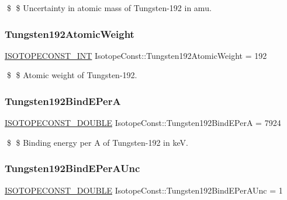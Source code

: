 \$ \$ Uncertainty in atomic mass of Tungsten-\/192 in amu. \mbox{\label{group___isotope_const-_tungsten-_w192_gaad163033f4c7882dc3f116c7ee0eed69}} 
\subsubsection{\texorpdfstring{Tungsten192\+Atomic\+Weight}{Tungsten192AtomicWeight}}
{\footnotesize\ttfamily \mbox{\hyperlink{group___isotope_const-_macros_ga5f18360b3e99483a35c32d789e62621c}{I\+S\+O\+T\+O\+P\+E\+C\+O\+N\+S\+T\+\_\+\+I\+NT}} Isotope\+Const\+::\+Tungsten192\+Atomic\+Weight = 192}

\$ \$ Atomic weight of Tungsten-\/192. \mbox{\label{group___isotope_const-_tungsten-_w192_ga0bdde55f752d75da20fd69cf1fb620a5}} 
\subsubsection{\texorpdfstring{Tungsten192\+Bind\+E\+PerA}{Tungsten192BindEPerA}}
{\footnotesize\ttfamily \mbox{\hyperlink{group___isotope_const-_macros_ga8f45a7272ce02c0b4c65c44636ed719a}{I\+S\+O\+T\+O\+P\+E\+C\+O\+N\+S\+T\+\_\+\+D\+O\+U\+B\+LE}} Isotope\+Const\+::\+Tungsten192\+Bind\+E\+PerA = 7924}

\$ \$ Binding energy per A of Tungsten-\/192 in keV. \mbox{\label{group___isotope_const-_tungsten-_w192_ga36c540f66b237e6adad27826fefb8afe}} 
\subsubsection{\texorpdfstring{Tungsten192\+Bind\+E\+Per\+A\+Unc}{Tungsten192BindEPerAUnc}}
{\footnotesize\ttfamily \mbox{\hyperlink{group___isotope_const-_macros_ga8f45a7272ce02c0b4c65c44636ed719a}{I\+S\+O\+T\+O\+P\+E\+C\+O\+N\+S\+T\+\_\+\+D\+O\+U\+B\+LE}} Isotope\+Const\+::\+Tungsten192\+Bind\+E\+Per\+A\+Unc = 1}


